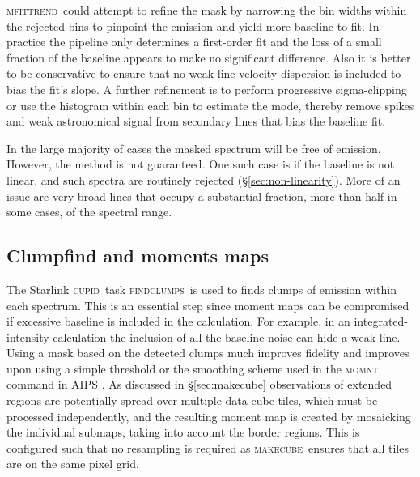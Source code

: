 \documentclass[a4paper,fleqn,usenatbib]{mnras}
\newcommand{\cupid}{\textsc{cupid}}
\newcommand{\makecube}{\textsc{makecube}}
\newcommand{\mfittrend}{\textsc{mfittrend}}
\newcommand{\findclumps}{\textsc{findclumps}}
\newcommand{\ascl}[1]{\href{http://www.ascl.net/#1}{ascl:#1}}
\begin{document}
\mfittrend\ could attempt to refine the mask by narrowing the bin
widths within the rejected bins to pinpoint the emission and yield
more baseline to fit.  In practice the pipeline only determines a
first-order fit and the loss of a small fraction of the baseline
appears to make no significant difference.  Also it is better to be
conservative to ensure that no weak line velocity dispersion is
included to bias the fit's slope.  A further refinement is to perform
progressive sigma-clipping or use the histogram within each bin to
estimate the mode, thereby remove spikes and weak astronomical signal
from secondary lines that bias the baseline fit.

In the large majority of cases the masked spectrum will be free of
emission.  However, the method is not guaranteed.  One such case is if
the baseline is not linear, and such spectra are routinely rejected
(\mbox{\S \ref{sec:non-linearity}}).  More of an issue are very broad
lines that occupy a substantial fraction, more than half in some
cases, of the spectral range.

\subsection{Clumpfind and moments maps \label{sec:moment}}

The Starlink \cupid\ task \findclumps\ is used to finds clumps of
emission within each spectrum.
This is an essential step since moment maps can be compromised
if excessive baseline is included in the calculation. For example, in an
integrated-intensity calculation the inclusion of all the baseline noise can
hide a weak line.
Using a mask based on the detected clumps much improves
fidelity and improves upon using a simple threshold or
the smoothing scheme used in the \textsc{momnt} command in AIPS
\cite[][\ascl{9911.003}]{2003ASSL..285..109G}. As discussed in
\mbox{\S \ref{sec:makecube}}
observations of extended regions are potentially spread over multiple
data cube tiles, which must be processed independently, and the resulting
moment map is created by
mosaicking the individual submaps, taking into account the border
regions. This is configured such that no resampling is required as
\makecube\ ensures that all tiles are on the same pixel grid.
\end{document}
